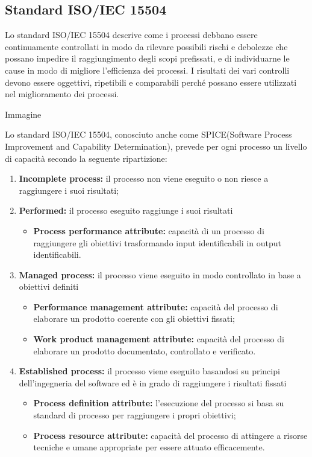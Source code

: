 \subsection{Standard ISO/IEC 15504}
\begin{flushleft}
Lo standard ISO/IEC 15504 descrive come i processi debbano essere continuamente controllati in modo da rilevare possibili rischi e debolezze che possano impedire il raggiungimento degli scopi prefissati, e di individuarne le cause in modo di migliore l'efficienza dei processi. I risultati dei vari controlli devono essere oggettivi, ripetibili e comparabili perché possano essere utilizzati nel miglioramento dei processi.

Immagine

Lo standard ISO/IEC 15504, conosciuto anche come SPICE(Software Process Improvement and Capability Determination), prevede per ogni processo un livello di capacità secondo la seguente ripartizione:

\begin{enumerate}[label*=\arabic*]
	\item \textbf{Incomplete process:} il processo non viene eseguito o non riesce a raggiungere i suoi risultati;
	
	\item \textbf{Performed:} il processo eseguito raggiunge i suoi risultati
		\begin{itemize}
			\item \textbf{Process performance attribute:} capacità di un processo di raggiungere gli obiettivi trasformando input identificabili in output identificabili.
		\end{itemize}
		
	\item \textbf{Managed process:} il processo viene eseguito in modo controllato in base a obiettivi definiti
		\begin{itemize}
			\item \textbf{Performance management attribute:} capacità del processo di elaborare un prodotto coerente con gli obiettivi fissati;
			\item \textbf{Work product management attribute:} capacità del processo di elaborare un prodotto documentato, controllato e verificato.
		\end{itemize}
		
		
	\item \textbf{Established process:} il processo viene eseguito basandosi su principi dell'ingegneria del software ed è in grado di raggiungere i risultati fissati
		\begin{itemize}
			\item \textbf{Process definition attribute:} l'esecuzione del processo si basa su standard di processo per raggiungere i propri obiettivi;
			\item \textbf{Process resource attribute:} capacità del processo di attingere a risorse tecniche e umane appropriate per essere attuato efficacemente.
		\end{itemize}
		

\end{enumerate}
\end{flushleft}
